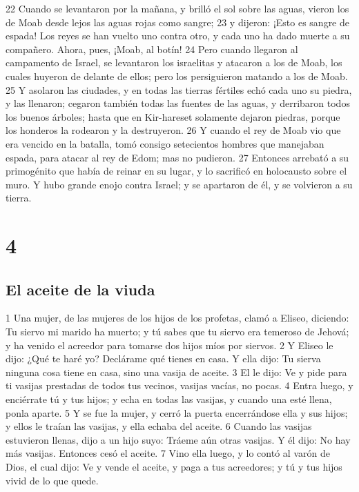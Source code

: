 22 Cuando se levantaron por la mañana, y brilló el sol sobre las aguas, vieron los de Moab desde lejos las aguas rojas como sangre;
23 y dijeron: ¡Esto es sangre de espada! Los reyes se han vuelto uno contra otro, y cada uno ha dado muerte a su compañero. Ahora, pues, ¡Moab, al botín!
24 Pero cuando llegaron al campamento de Israel, se levantaron los israelitas y atacaron a los de Moab, los cuales huyeron de delante de ellos; pero los persiguieron matando a los de Moab.
25 Y asolaron las ciudades, y en todas las tierras fértiles echó cada uno su piedra, y las llenaron; cegaron también todas las fuentes de las aguas, y derribaron todos los buenos árboles; hasta que en Kir-hareset solamente dejaron piedras, porque los honderos la rodearon y la destruyeron.
26 Y cuando el rey de Moab vio que era vencido en la batalla, tomó consigo setecientos hombres que manejaban espada, para atacar al rey de Edom; mas no pudieron.
27 Entonces arrebató a su primogénito que había de reinar en su lugar, y lo sacrificó en holocausto sobre el muro. Y hubo grande enojo contra Israel; y se apartaron de él, y se volvieron a su tierra.

\chapter{4}

\section*{El aceite de la viuda}

1 Una mujer, de las mujeres de los hijos de los profetas, clamó a Eliseo, diciendo: Tu siervo mi marido ha muerto; y tú sabes que tu siervo era temeroso de Jehová; y ha venido el acreedor para tomarse dos hijos míos por siervos.
2 Y Eliseo le dijo: ¿Qué te haré yo? Declárame qué tienes en casa. Y ella dijo: Tu sierva ninguna cosa tiene en casa, sino una vasija de aceite.
3 El le dijo: Ve y pide para ti vasijas prestadas de todos tus vecinos, vasijas vacías, no pocas.
4 Entra luego, y enciérrate tú y tus hijos; y echa en todas las vasijas, y cuando una esté llena, ponla aparte.
5 Y se fue la mujer, y cerró la puerta encerrándose ella y sus hijos; y ellos le traían las vasijas, y ella echaba del aceite.
6 Cuando las vasijas estuvieron llenas, dijo a un hijo suyo: Tráeme aún otras vasijas. Y él dijo: No hay más vasijas. Entonces cesó el aceite.
7 Vino ella luego, y lo contó al varón de Dios, el cual dijo: Ve y vende el aceite, y paga a tus acreedores; y tú y tus hijos vivid de lo que quede.


